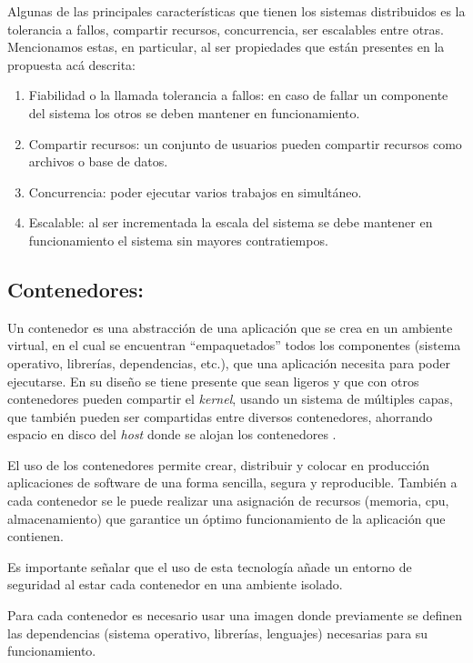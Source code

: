 \documentclass[
  10,
  openany]{book}
\begin{document}
Algunas de las principales características que tienen los sistemas distribuidos es la tolerancia a fallos, compartir recursos, concurrencia, ser escalables \citep{czaja2018} entre otras. Mencionamos estas, en particular, al ser propiedades que están presentes en la propuesta acá descrita:

\begin{enumerate}
\def\labelenumi{\arabic{enumi}.}
\item
  Fiabilidad o la llamada tolerancia a fallos: en caso de fallar un componente del sistema los otros se deben mantener en funcionamiento.
\item
  Compartir recursos: un conjunto de usuarios pueden compartir recursos como archivos o base de datos.
\item
  Concurrencia: poder ejecutar varios trabajos en simultáneo.
\item
  Escalable: al ser incrementada la escala del sistema se debe mantener en funcionamiento el sistema sin mayores contratiempos.
\end{enumerate}

\hypertarget{contenedores}{%
\subsection{Contenedores:}\label{contenedores}}

Un contenedor es una abstracción de una aplicación que se crea en un ambiente virtual, en el cual se encuentran ``empaquetados'' todos los componentes (sistema operativo, librerías, dependencias, etc.), que una aplicación necesita para poder ejecutarse. En su diseño se tiene presente que sean ligeros y que con otros contenedores pueden compartir el \emph{kernel}, usando un sistema de múltiples capas, que también pueden ser compartidas entre diversos contenedores, ahorrando espacio en disco del \emph{host} donde se alojan los contenedores \citep{nüst2020}.

El uso de los contenedores permite crear, distribuir y colocar en producción aplicaciones de software de una forma sencilla, segura y reproducible. También a cada contenedor se le puede realizar una asignación de recursos (memoria, cpu, almacenamiento) que garantice un óptimo funcionamiento de la aplicación que contienen.

Es importante señalar que el uso de esta tecnología añade un entorno de seguridad al estar cada contenedor en una ambiente isolado.

Para cada contenedor es necesario usar una imagen donde previamente se definen las dependencias (sistema operativo, librerías, lenguajes) necesarias para su funcionamiento.
\end{document}
